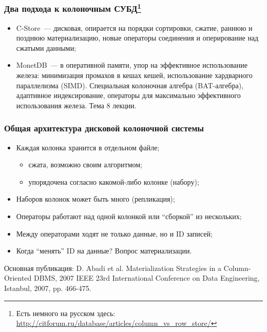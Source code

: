\documentclass{beamer}
\begin{document}
\begin{frame}
\frametitle{Два подхода к колоночным СУБД\footnote{Есть немного на русском здесь: \url{http://citforum.ru/database/articles/column\_vs\_row\_store/}}}

\begin{itemize}
  \setlength\itemsep{1em}
  \item C-Store~--- дисковая, опирается на порядки сортировки, сжатие, раннюю и позднюю материализацию, новые операторы соединения и оперирование над сжатыми данными;
  \item MonetDB~--- в оперативной памяти, упор на эффективное использование железа: минимизация промахов в кешах кешей, использование хардварного параллелизма (SIMD). Специальная колоночная алгебра (BAT-алгебра), адаптивное индексирование, операторы для максимально эффективного использования железа. Тема 8 лекции.
\end{itemize}

\end{frame}


\begin{frame}
\frametitle{Общая архитектура дисковой колоночной системы}

\begin{itemize}
  \setlength\itemsep{1em}
  \item Каждая колонка хранится в отдельном файле;
  \begin{itemize}
    \item сжата, возможно своим алгоритмом;
    \item упорядочена согласно какомой-либо колонке (набору);
  \end{itemize}
  \item Наборов колонок может быть много (репликация);
  \item Операторы работают над одной колонкой или ``сборкой'' из нескольких;
  \item Между операторами ходят не только данные, но и ID записей;
  \item Когда ``менять'' ID на данные? Вопрос материализации.
\end{itemize}

Основная публикация: D. Abadi et al. Materialization Strategies in a Column-Oriented DBMS, 2007 IEEE 23rd International Conference on Data Engineering, Istanbul, 2007, pp. 466-475.

\end{frame}
\end{document}
